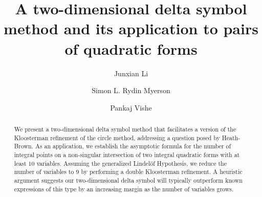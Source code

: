 \documentclass[letterpaper,11pt]{amsart}
\numberwithin{equation}{section}
\theoremstyle{definition}
\numberwithin{equation}{section}
\begin{document}



\title[Two-dimensional delta symbol method]{A  two-dimensional delta symbol method and its application to pairs of quadratic forms}

 \author[J. Li]{Junxian Li}
 \address{Department of Mathematics\\
 University of California, Davis,
 1 Shields Avenue, Davis, CA 95616, U.S.A
 }

 \author[S. L. Rydin Myerson]{Simon L. Rydin Myerson}
 \address{Department of Mathematical Sciences, Chalmers University of Technology and the University of Gothenburg, 412 96 Gothenburg, Sweden}

 \author[P. Vishe]{Pankaj Vishe}
 \address{Department of Mathematical Sciences, Durham University, Durham, DH1 3LE, United Kingdom}



\begin{abstract}
	We present a  two-dimensional delta symbol method that facilitates a version of the Kloosterman refinement of the circle method, addressing a question posed by Heath-Brown.  As an application, we establish the asymptotic formula for the number of integral points on a non-singular intersection of two integral quadratic forms with at least $10$ variables. Assuming the generalized Lindel\"of Hypothesis, we reduce the number of variables to $9$ by performing a double Kloosterman refinement. A heuristic argument suggests our  two-dimensional delta symbol will typically outperform known expressions of this type by an increasing margin as the number of variables grows.
\end{abstract}

\maketitle
 \setcounter{tocdepth}{1}
\tableofcontents
\end{document}
